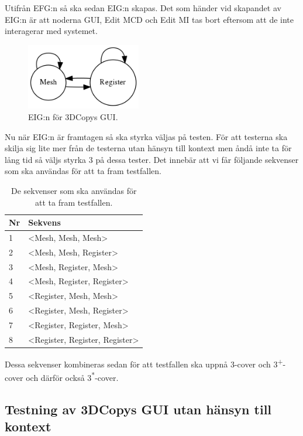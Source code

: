 Utifrån EFG:n så ska sedan EIG:n skapas. Det som händer vid skapandet av EIG:n är att noderna GUI, Edit MCD och Edit MI tas bort eftersom att de inte interagerar med systemet.

\begin{figure}[H]
	\centering
	\includegraphics[width=50mm]{figures/3DCopyGUIEIG.png}
	\caption{EIG:n för 3DCopys GUI.}
	\label{fig:3dcopy_guieig}
\end{figure}

Nu när EIG:n är framtagen så ska styrka väljas på testen. För att testerna ska skilja sig lite mer från de testerna utan hänsyn till kontext men åndå inte ta för lång tid så väljs styrka 3 på dessa tester. Det innebär att vi får följande sekvenser som ska användas för att ta fram testfallen.

\begin{table}[h]
	\caption{De sekvenser som ska användas för att ta fram testfallen.}
	\centering
\begin{tabular}{|l|l|}
	\hline
	\textbf{Nr} & \textbf{Sekvens} \\
	\hline
	1 & <Mesh, Mesh, Mesh> \\
	\hline
	2 & <Mesh, Mesh, Register> \\
	\hline
	3 & <Mesh, Register, Mesh> \\
	\hline
	4 & <Mesh, Register, Register> \\
	\hline
	5 & <Register, Mesh, Mesh> \\
	\hline
	6 & <Register, Mesh, Register> \\
	\hline
	7 & <Register, Register, Mesh> \\
	\hline
	8 & <Register, Register, Register> \\
	\hline
\end{tabular}
\end{table}

Dessa sekvenser kombineras sedan för att testfallen ska uppnå 3-cover och 3\textsuperscript{+}-cover och därför också 3\textsuperscript{*}-cover.



\subsection{Testning av 3DCopys GUI utan hänsyn till kontext}

